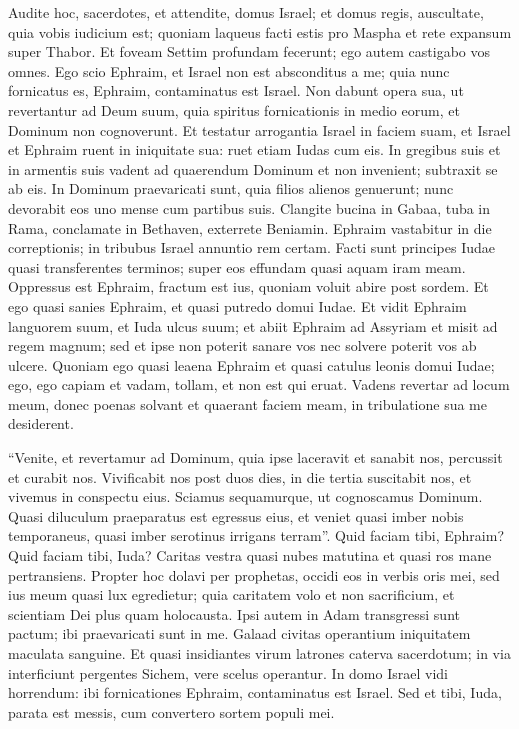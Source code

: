 \begin{biblechapter}
\begin{biblechapter}
\begin{biblechapter}
\begin{biblechapter}
\begin{biblechapter}
 \verse Audite hoc, sacerdotes,
 et attendite, domus Israel;
 et domus regis, auscultate,
 quia vobis iudicium est;
 quoniam laqueus facti estis pro Maspha
 et rete expansum super Thabor.
 \verse Et foveam Settim profundam fecerunt;
 ego autem castigabo vos omnes.
 \verse Ego scio Ephraim,
 et Israel non est absconditus a me;
 quia nunc fornicatus es, Ephraim,
 contaminatus est Israel.
 \verse Non dabunt opera sua,
 ut revertantur ad Deum suum,
 quia spiritus fornicationis in medio eorum,
 et Dominum non cognoverunt.
 \verse Et testatur arrogantia Israel in faciem suam,
 et Israel et Ephraim ruent in iniquitate sua:
 ruet etiam Iudas cum eis.
 \verse In gregibus suis et in armentis suis
 vadent ad quaerendum Dominum
 et non invenient;
 subtraxit se ab eis.
 \verse In Dominum praevaricati sunt,
 quia filios alienos genuerunt;
 nunc devorabit eos uno mense cum partibus suis.
 \verse Clangite bucina in Gabaa,
 tuba in Rama,
 conclamate in Bethaven,
 exterrete Beniamin.
 \verse Ephraim vastabitur in die correptionis;
 in tribubus Israel annuntio rem certam.
 \verse Facti sunt principes Iudae
 quasi transferentes terminos;
 super eos effundam
 quasi aquam iram meam.
 \verse Oppressus est Ephraim,
 fractum est ius,
 quoniam voluit abire post sordem.
 \verse Et ego quasi sanies Ephraim,
 et quasi putredo domui Iudae.
 \verse Et vidit Ephraim languorem suum,
 et Iuda ulcus suum;
 et abiit Ephraim ad Assyriam
 et misit ad regem magnum;
 sed et ipse non poterit sanare vos
 nec solvere poterit vos ab ulcere.
 \verse Quoniam ego quasi leaena Ephraim
 et quasi catulus leonis domui Iudae;
 ego, ego capiam et vadam,
 tollam, et non est qui eruat.
 \verse Vadens revertar ad locum meum,
 donec poenas solvant
 et quaerant faciem meam,
 in tribulatione sua me desiderent.
 
\begin{biblechapter}
 \verse “Venite, et revertamur ad Dominum,
 quia ipse laceravit et sanabit nos,
 percussit et curabit nos.
 \verse Vivificabit nos post duos dies,
 in die tertia suscitabit nos,
 et vivemus in conspectu eius.
 \verse Sciamus sequamurque,
 ut cognoscamus Dominum.
 Quasi diluculum praeparatus est egressus eius,
 et veniet quasi imber nobis temporaneus,
 quasi imber serotinus irrigans terram”.
 \verse Quid faciam tibi, Ephraim?
 Quid faciam tibi, Iuda?
 Caritas vestra quasi nubes matutina
 et quasi ros mane pertransiens.
 \verse Propter hoc dolavi per prophetas,
 occidi eos in verbis oris mei,
 sed ius meum quasi lux egredietur;
 \verse quia caritatem volo et non sacrificium,
 et scientiam Dei plus quam holocausta.
 \verse Ipsi autem in Adam transgressi sunt pactum;
 ibi praevaricati sunt in me.
 \verse Galaad civitas operantium iniquitatem
 maculata sanguine.
 \verse Et quasi insidiantes virum latrones
 caterva sacerdotum;
 in via interficiunt pergentes Sichem,
 vere scelus operantur.
 \verse In domo Israel vidi horrendum:
 ibi fornicationes Ephraim,
 contaminatus est Israel.
 \verse Sed et tibi, Iuda, parata est messis,
 cum convertero sortem populi mei.
 

\end{biblechapter}
\end{biblechapter}
\end{biblechapter}
\end{biblechapter}
\end{biblechapter}
\end{biblechapter}
